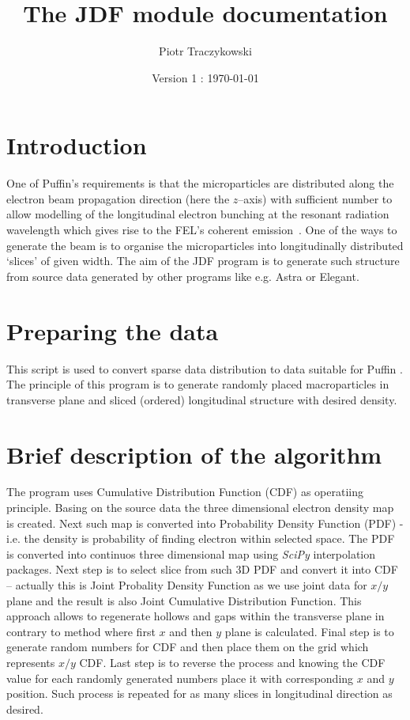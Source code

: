 \documentclass[12pt]{article}
\begin{document}
\title  { \Huge \bf The JDF module documentation}
\author { Piotr Traczykowski}
\date {Version 1 : \today}
\maketitle

\lstset{numbers=none,numbersep=8pt,frame=single,breaklines=true,language=Python, framexleftmargin=5pt}

\section{Introduction}
One of Puffin's requirements is that the microparticles are distributed along the electron beam propagation direction (here the $z$--axis) with sufficient number to allow modelling of the longitudinal electron bunching at the resonant radiation wavelength which gives rise to the FEL's coherent emission~\cite{puffin}. One of the ways to generate the beam is to organise the microparticles into longitudinally distributed `slices' of given width. The aim of the JDF program is to generate such structure from source data generated by other programs like e.g. Astra or Elegant.

\section{Preparing the data}
This script is used to convert sparse data distribution to data suitable for Puffin \cite{puffin}. The principle of this program is to generate randomly placed macroparticles in transverse plane and sliced (ordered) longitudinal structure with desired density. 


\section{Brief description of the algorithm}
The program uses Cumulative Distribution Function (CDF) as operatiing principle. Basing on the source data the three dimensional electron density map is created. Next such map is converted into Probability Density Function (PDF) - i.e. the density is probability of finding electron within selected space. The PDF is converted into continuos three dimensional map using {\it SciPy} interpolation packages. Next step is to select slice from such 3D PDF and convert it into CDF -- actually this is Joint Probality Density Function as we use joint data for $x/y$ plane and the result is also Joint Cumulative Distribution Function. This approach allows to regenerate hollows and gaps within the transverse plane in contrary to method where first $x$ and then $y$ plane is calculated. Final step is to generate random numbers for CDF and then place them on the grid which represents $x/y$ CDF. Last step is to reverse the process and knowing the CDF value for each randomly generated numbers place it with corresponding $x$ and $y$ position. Such process is repeated for as many slices in longitudinal direction as desired.
\end{document}
